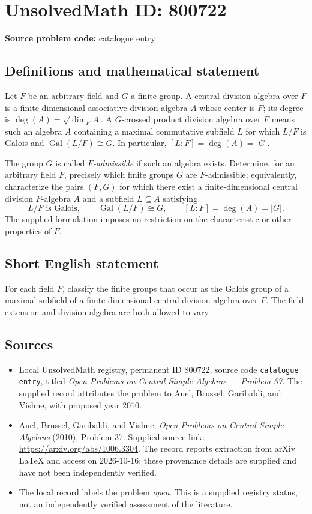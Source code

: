 \documentclass[11pt]{article}
\begin{document}
\section*{UnsolvedMath ID: 800722}
\textbf{Source problem code:} catalogue entry
\subsection{Definitions and mathematical statement}
Let \(F\) be an arbitrary field and \(G\) a finite group. A central division algebra over \(F\) is a finite-dimensional associative division algebra \(A\) whose center is \(F\); its degree is \(\deg(A)=\sqrt{\dim_F A}\). A \(G\)-crossed product division algebra over \(F\) means such an algebra \(A\) containing a maximal commutative subfield \(L\) for which \(L/F\) is Galois and \(\operatorname{Gal}(L/F)\cong G\). In particular, \([L:F]=\deg(A)=|G|\).

The group \(G\) is called \emph{\(F\)-admissible} if such an algebra exists. Determine, for an arbitrary field \(F\), precisely which finite groups \(G\) are \(F\)-admissible; equivalently, characterize the pairs \((F,G)\) for which there exist a finite-dimensional central division \(F\)-algebra \(A\) and a subfield \(L\subseteq A\) satisfying
\[
L/F\text{ is Galois},\qquad \operatorname{Gal}(L/F)\cong G,\qquad [L:F]=\deg(A)=|G|.
\]
The supplied formulation imposes no restriction on the characteristic or other properties of \(F\).
\subsection{Short English statement}
For each field \(F\), classify the finite groups that occur as the Galois group of a maximal subfield of a finite-dimensional central division algebra over \(F\). The field extension and division algebra are both allowed to vary.
\subsection{Sources}
\begin{itemize}
\item Local UnsolvedMath registry, permanent ID \(800722\), source code \texttt{catalogue entry}, titled \emph{Open Problems on Central Simple Algebras --- Problem 37}. The supplied record attributes the problem to Auel, Brussel, Garibaldi, and Vishne, with proposed year 2010.
\item Auel, Brussel, Garibaldi, and Vishne, \emph{Open Problems on Central Simple Algebras} (2010), Problem 37. Supplied source link: \url{https://arxiv.org/abs/1006.3304}. The record reports extraction from arXiv LaTeX and access on 2026-10-16; these provenance details are supplied and have not been independently verified.
\item The local record labels the problem \emph{open}. This is a supplied registry status, not an independently verified assessment of the literature.
\end{itemize}
\end{document}
